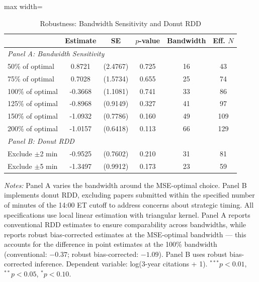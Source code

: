 \begin{table}[htbp]
\centering
\caption{Robustness: Bandwidth Sensitivity and Donut RDD}
\label{tab:robustness}
\begin{adjustbox}{max width=\textwidth}
\begin{tabular}{lccccc}
\hline\hline
& Estimate & SE & $p$-value & Bandwidth & Eff. $N$ \\
\hline
\multicolumn{6}{l}{\textit{Panel A: Bandwidth Sensitivity}} \\
50\% of optimal & 0.8721 & (2.4767) & 0.725 & 16 & 43 \\
75\% of optimal & 0.7028 & (1.5734) & 0.655 & 25 & 74 \\
100\% of optimal & -0.3668 & (1.1081) & 0.741 & 33 & 86 \\
125\% of optimal & -0.8968 & (0.9149) & 0.327 & 41 & 97 \\
150\% of optimal & -1.0932 & (0.7786) & 0.160 & 49 & 109 \\
200\% of optimal & -1.0157 & (0.6418) & 0.113 & 66 & 129 \\
\hline
\multicolumn{6}{l}{\textit{Panel B: Donut RDD}} \\
Exclude $\pm$2 min & -0.9525 & (0.7602) & 0.210 & 31 & 81 \\
Exclude $\pm$5 min & -1.3497 & (0.9912) & 0.173 & 23 & 59 \\
\hline\hline
\end{tabular}
\end{adjustbox}
\begin{minipage}{0.95\textwidth}
\footnotesize
\textit{Notes:} Panel A varies the bandwidth around the MSE-optimal choice. Panel B implements donut RDD, excluding papers submitted within the specified number of minutes of the 14:00 ET cutoff to address concerns about strategic timing. All specifications use local linear estimation with triangular kernel. Panel A reports conventional RDD estimates to ensure comparability across bandwidths, while  reports robust bias-corrected estimates at the MSE-optimal bandwidth --- this accounts for the difference in point estimates at the 100\% bandwidth (conventional: $-0.37$; robust bias-corrected: $-1.09$). Panel B uses robust bias-corrected inference. Dependent variable: log(3-year citations + 1). $^{***}p<0.01$, $^{**}p<0.05$, $^{*}p<0.10$.
\end{minipage}
\end{table}
